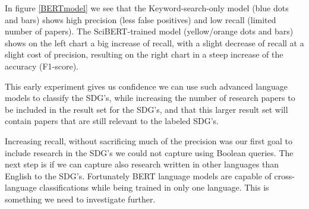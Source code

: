 \documentclass{article}
\begin{document}
In figure \ref{BERTmodel} we see that the Keyword-search-only model (blue dots and bars) shows high precision (less false positives) and low recall (limited number of papers). The SciBERT-trained model (yellow/orange dots and bars) shows on the left chart a big increase of recall, with a slight decrease of recall at a slight cost of precision, resulting on the right chart in a steep increase of the accuracy (F1-score).

This early experiment gives us confidence we can use such advanced language models to classify the SDG's, while increasing the number of research papers to be included in the result set for the SDG's, and that this larger result set will contain papers that are still relevant to the labeled SDG's.

Increasing recall, without sacrificing much of the precision was our first goal to include research in the SDG's we could not capture using Boolean queries. The next step is if we can capture also research written in other languages than English to the SDG's. Fortunately BERT language models are capable of cross-language classifications while being trained in only one language. This is something we need to investigate further.


  

\end{document}
